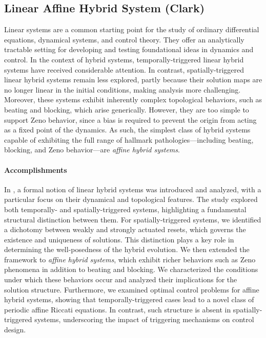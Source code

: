 \documentclass[letterpaper,11pt]{article}
\begin{document}
\subsection{Linear Affine Hybrid System (Clark)}\label{sec:affine_HS}

Linear systems are a common starting point for the study of ordinary differential equations, dynamical systems, and control theory.
They offer an analytically tractable setting for developing and testing foundational ideas in dynamics and control.
In the context of hybrid systems, temporally-triggered linear hybrid systems have received considerable attention.
In contrast, spatially-triggered linear hybrid systems remain less explored, partly because their solution maps are no longer linear in the initial conditions, making analysis more challenging.
Moreover, these systems exhibit inherently complex topological behaviors, such as beating and blocking, which arise generically.
However, they are too simple to support Zeno behavior, since a bias is required to prevent the origin from acting as a fixed point of the dynamics.
As such, the simplest class of hybrid systems capable of exhibiting the full range of hallmark pathologies—including beating, blocking, and Zeno behavior—are \textit{affine hybrid systems}.

\paragraph{Accomplishments}
In \cite{clark_linear}, a formal notion of linear hybrid systems was introduced and analyzed, with a particular focus on their dynamical and topological features.
The study explored both temporally- and spatially-triggered systems, highlighting a fundamental structural distinction between them.
For spatially-triggered systems, we identified a dichotomy between weakly and strongly actuated resets, which governs the existence and uniqueness of solutions.
This distinction plays a key role in determining the well-posedness of the hybrid evolution.
We then extended the framework to \textit{affine hybrid systems}, which exhibit richer behaviors such as Zeno phenomena in addition to beating and blocking.
We characterized the conditions under which these behaviors occur and analyzed their implications for the solution structure.
Furthermore, we examined optimal control problems for affine hybrid systems, showing that temporally-triggered cases lead to a novel class of periodic affine Riccati equations.
In contrast, such structure is absent in spatially-triggered systems, underscoring the impact of triggering mechanisms on control design.
\end{document}
